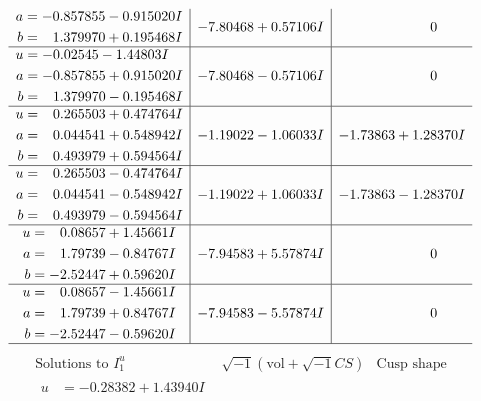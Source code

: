 \documentclass[1p]{elsarticle_modified}
\theoremstyle{definition}
\newcommand{\I}{\sqrt{-1}}
\begin{document}
$$\begin{array}{c|c|c}
\begin{aligned}
a &= -0.857855 - 0.915020 I \\
b &= \phantom{-}1.379970 + 0.195468 I\end{aligned}
 & -7.80468 + 0.57106 I & \phantom{-0.000000 } 0 \\ \hline\begin{aligned}
u &= -0.02545 - 1.44803 I \\
a &= -0.857855 + 0.915020 I \\
b &= \phantom{-}1.379970 - 0.195468 I\end{aligned}
 & -7.80468 - 0.57106 I & \phantom{-0.000000 } 0 \\ \hline\begin{aligned}
u &= \phantom{-}0.265503 + 0.474764 I \\
a &= \phantom{-}0.044541 + 0.548942 I \\
b &= \phantom{-}0.493979 + 0.594564 I\end{aligned}
 & -1.19022 - 1.06033 I & -1.73863 + 1.28370 I \\ \hline\begin{aligned}
u &= \phantom{-}0.265503 - 0.474764 I \\
a &= \phantom{-}0.044541 - 0.548942 I \\
b &= \phantom{-}0.493979 - 0.594564 I\end{aligned}
 & -1.19022 + 1.06033 I & -1.73863 - 1.28370 I \\ \hline\begin{aligned}
u &= \phantom{-}0.08657 + 1.45661 I \\
a &= \phantom{-}1.79739 - 0.84767 I \\
b &= -2.52447 + 0.59620 I\end{aligned}
 & -7.94583 + 5.57874 I & \phantom{-0.000000 } 0 \\ \hline\begin{aligned}
u &= \phantom{-}0.08657 - 1.45661 I \\
a &= \phantom{-}1.79739 + 0.84767 I \\
b &= -2.52447 - 0.59620 I\end{aligned}
 & -7.94583 - 5.57874 I & \phantom{-0.000000 } 0\\
 \hline 
 \end{array}$$\newpage$$\begin{array}{c|c|c}  
\text{Solutions to }I^u_{1}& \I (\text{vol} + \sqrt{-1}CS) & \text{Cusp shape}\\
 \hline 
\begin{aligned}
u &= -0.28382 + 1.43940 I \\

\end{aligned}
\end{array}$$
\end{document}
